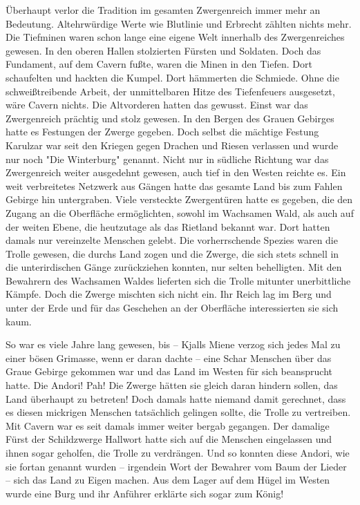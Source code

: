 \documentclass[10pt, a4paper, oneside]{book}
\begin{document}
\begin{multicols}{2}
Überhaupt verlor die Tradition im gesamten Zwergenreich immer mehr an Bedeutung. Altehrwürdige Werte wie Blutlinie und Erbrecht zählten nichts mehr. Die Tiefminen waren schon lange eine eigene Welt innerhalb des Zwergenreiches gewesen. In den oberen Hallen stolzierten Fürsten und Soldaten. Doch das Fundament, auf dem Cavern fußte, waren die Minen in den Tiefen. Dort schaufelten und hackten die Kumpel. Dort hämmerten die Schmiede. Ohne die schweißtreibende Arbeit, der unmittelbaren Hitze des Tiefenfeuers ausgesetzt, wäre Cavern nichts. Die Altvorderen hatten das gewusst. Einst war das Zwergenreich prächtig und stolz gewesen. In den Bergen des Grauen Gebirges hatte es Festungen der Zwerge gegeben. Doch selbst die mächtige Festung Karulzar war seit den Kriegen gegen Drachen und Riesen verlassen und wurde nur noch "Die Winterburg" genannt. Nicht nur in südliche Richtung war das Zwergenreich weiter ausgedehnt gewesen, auch tief in den Westen reichte es. Ein weit verbreitetes Netzwerk aus Gängen hatte das gesamte Land bis zum Fahlen Gebirge hin untergraben. Viele versteckte Zwergentüren hatte es gegeben, die den Zugang an die Oberfläche ermöglichten, sowohl im Wachsamen Wald, als auch auf der weiten Ebene, die heutzutage als das Rietland bekannt war. Dort hatten damals nur vereinzelte Menschen gelebt. Die vorherrschende Spezies waren die Trolle gewesen, die durchs Land zogen und die Zwerge, die sich stets schnell in die unterirdischen Gänge zurückziehen konnten, nur selten behelligten. Mit den Bewahrern des Wachsamen Waldes lieferten sich die Trolle mitunter unerbittliche Kämpfe. Doch die Zwerge mischten sich nicht ein. Ihr Reich lag im Berg und unter der Erde und für das Geschehen an der Oberfläche interessierten sie sich kaum.\bigskip

So war es viele Jahre lang gewesen, bis – Kjalls Miene verzog sich jedes Mal zu einer bösen Grimasse, wenn er daran dachte – eine Schar Menschen über das Graue Gebirge gekommen war und das Land im Westen für sich beansprucht hatte. Die Andori! Pah! Die Zwerge hätten sie gleich daran hindern sollen, das Land überhaupt zu betreten! Doch damals hatte niemand damit gerechnet, dass es diesen mickrigen Menschen tatsächlich gelingen sollte, die Trolle zu vertreiben. Mit Cavern war es seit damals immer weiter bergab gegangen. Der damalige Fürst der Schildzwerge Hallwort hatte sich auf die Menschen eingelassen und ihnen sogar geholfen, die Trolle zu verdrängen. Und so konnten diese Andori, wie sie fortan genannt wurden – irgendein Wort der Bewahrer vom Baum der Lieder – sich das Land zu Eigen machen. Aus dem Lager auf dem Hügel im Westen wurde eine Burg und ihr Anführer erklärte sich sogar zum König!\bigskip


\end{multicols}
\end{document}
